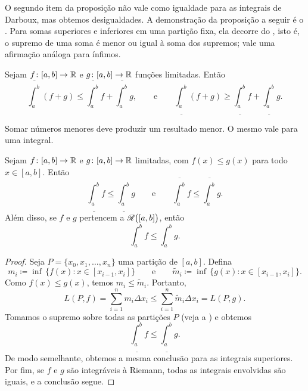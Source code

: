 O segundo item da proposição não vale como igualdade para as integrais de
Darboux, mas obtemos desigualdades.
A demonstração da proposição a seguir é o
.
Para somas superiores e inferiores em uma partição fixa, ela decorre do
, isto é, o supremo de uma soma é menor ou
igual à soma dos supremos; vale uma afirmação análoga para ínfimos.

\begin{prop} \label{prop:upperlowerlinineq}
Sejam $f \colon [a,b] \to {\mathbb{R}}$ e $g \colon [a,b] \to {\mathbb{R}}$ funções limitadas.
Então
\begin{equation*}
\overline{\int_a^b} (f+g) \leq \overline{\int_a^b}f+\overline{\int_a^b}g
,
\qquad
\text{e}
\qquad
\underline{\int_a^b} (f+g) \geq \underline{\int_a^b}f+\underline{\int_a^b}g
.
\end{equation*}
\end{prop}

Somar números menores deve produzir um resultado menor.
O mesmo vale para uma integral.

\begin{prop}[Monotonicidade]
Sejam $f \colon [a,b] \to {\mathbb{R}}$ e $g \colon [a,b] \to {\mathbb{R}}$
limitadas, com $f(x) \leq g(x)$
para todo $x \in [a,b]$. Então
\begin{equation*}
\underline{\int_a^b} f 
\leq
\underline{\int_a^b} g 
\qquad \text{e} \qquad
\overline{\int_a^b} f 
\leq
\overline{\int_a^b} g .
\end{equation*}
Além disso, se $f$ e $g$ pertencem a ${\mathscr{R}}\bigl([a,b]\bigr)$, então
\begin{equation*}
\int_a^b f 
\leq
\int_a^b g .
\end{equation*}
\end{prop}

\begin{proof}
Seja $P = \{ x_0, x_1, \ldots, x_n \}$ uma partição de $[a,b]$. Defina
\begin{equation*}
m_i \coloneqq \inf \, \bigl\{ f(x) : x \in [x_{i-1},x_i] \bigr\}
\qquad \text{e} \qquad
\widetilde{m}_i \coloneqq \inf \, \bigl\{ g(x) : x \in [x_{i-1},x_i] \bigr\} .
\end{equation*}
Como $f(x) \leq g(x)$, temos $m_i \leq \widetilde{m}_i$.
Portanto,
\begin{equation*}
L(P,f)
=
\sum_{i=1}^n m_i \Delta x_i
\leq
\sum_{i=1}^n \widetilde{m}_i \Delta x_i
=
L(P,g) .
\end{equation*}
Tomamos o supremo sobre todas as partições $P$ (veja a
) e obtemos
\begin{equation*}
\underline{\int_a^b} f 
\leq
\underline{\int_a^b} g .
\end{equation*}
De modo semelhante, obtemos a mesma conclusão para as integrais superiores.
Por fim, se $f$ e $g$ são integráveis à Riemann, todas as integrais envolvidas
são iguais, e a conclusão segue.
\end{proof}

